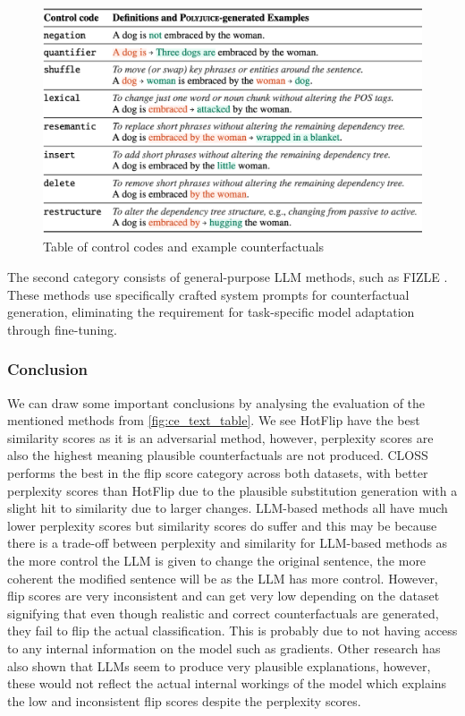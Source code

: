\begin{figure}[h]
    \centering
    \includegraphics[width=0.85\linewidth]{control_codes.png}
    \caption{Table of control codes and example counterfactuals \cite{wu_polyjuice_2021}}
    \label{fig:control_codes}
\end{figure}

The second category consists of general-purpose LLM methods, such as FIZLE \cite{bhattacharjee_zero-shot_2024}. These methods use specifically crafted system prompts for counterfactual generation, eliminating the requirement for task-specific model adaptation through fine-tuning.
\subsubsection{Conclusion}

We can draw some important conclusions by analysing the evaluation of the mentioned methods from \ref{fig:ce_text_table}. We see HotFlip have the best similarity scores as it is an adversarial method, however, perplexity scores are also the highest meaning plausible counterfactuals are not produced. CLOSS performs the best in the flip score category across both datasets, with better perplexity scores than HotFlip due to the plausible substitution generation with a slight hit to similarity due to larger changes. LLM-based methods all have much lower perplexity scores but similarity scores do suffer and this may be because there is a trade-off between perplexity and similarity for LLM-based methods as the more control the LLM is given to change the original sentence, the more coherent the modified sentence will be as the LLM has more control. However, flip scores are very inconsistent and can get very low depending on the dataset signifying that even though realistic and correct counterfactuals are generated, they fail to flip the actual classification. This is probably due to not having access to any internal information on the model such as gradients. 
Other research has also shown that LLMs seem to produce very plausible explanations, however, these would not reflect the actual internal workings of the model \cite{atanasova_faithfulness_2023, parcalabescu_measuring_2024, turpin_language_2023} which explains the low and inconsistent flip scores despite the perplexity scores.

